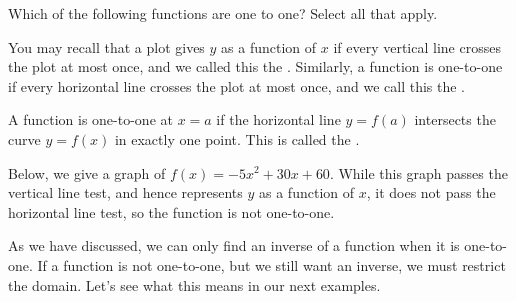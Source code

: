 \documentclass{ximera}
\begin{document}
\begin{question}
Which of the following functions are one to one?  Select all that
apply.
\begin{selectAll}
\end{selectAll}
\end{question}




You may recall that a plot gives $y$ as a function of $x$ if every
vertical line crosses the plot at most once, and we called this
the . Similarly, a function is one-to-one
if every horizontal line crosses the plot at most once, and we call this 
the .

\begin{theorem}
  A function is one-to-one at $x=a$ if the horizontal line $y = f(a)$
  intersects the curve $y=f(x)$ in exactly one point. This is called
  the .
\end{theorem}
Below, we give a graph of $f(x)=-5x^2+30x+60$. While this graph passes
the vertical line test, and hence represents $y$ as a function of $x$,
it does not pass the horizontal line test, so the function is not
one-to-one.
\begin{image}
\end{image}

As we have discussed, we can only find an inverse of a function when
it is one-to-one.  If a function is not one-to-one, but we still want
an inverse, we must restrict the domain. Let's see what this means in
our next examples.
\end{document}
